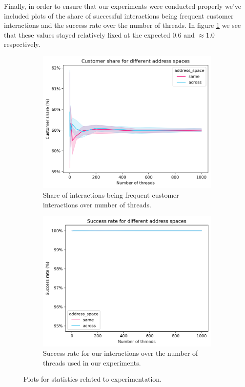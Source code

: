 \documentclass{article}
\begin{document}
Finally, in order to ensure that our experiments were conducted properly we've included plots of the share of successful interactions being frequent customer interactions and the success rate over the number of threads. In figure \ref{fig:inter-and-succrate} we see that these values stayed relatively fixed at the expected $0.6$ and $\approx1.0$ respectively.

\begin{figure}
	\centering
	\begin{subfigure}[b]{0.48\textwidth}
		\includegraphics[width=\textwidth]{plots/customer_share}
		\caption{Share of interactions being frequent customer interactions over number of threads.}
	\end{subfigure}
	\hfill
	\begin{subfigure}[b]{0.48\textwidth}
		\includegraphics[width=\textwidth]{plots/success_rate}
		\caption{Success rate for our interactions over the number of threads used in our experiments.}
	\end{subfigure}	
	\caption{Plots for statistics related to experimentation.}
	\label{fig:inter-and-succrate}
\end{figure}
\end{document}
